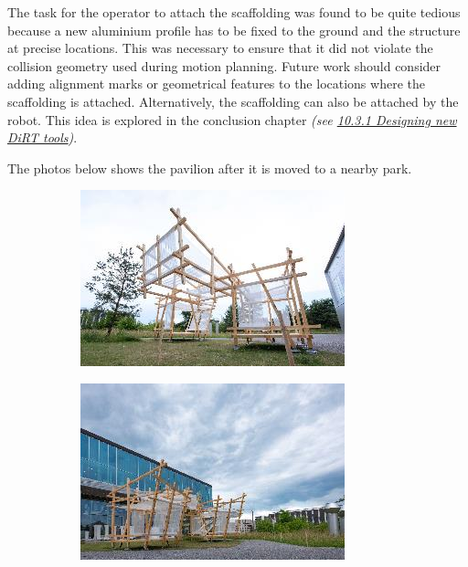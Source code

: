 \documentclass[11pt]{book}
\begin{document}
The task for the operator to attach the scaffolding was found to be quite tedious because a new aluminium profile has to be fixed to the ground and the structure at precise locations. This was necessary to ensure that it did not violate the collision geometry used during motion planning. Future work should consider adding alignment  marks or geometrical features to the locations where the scaffolding is attached. Alternatively, the scaffolding can also be attached by the robot. This idea is explored in the conclusion chapter \textit{(see \uline{10.3.1 Designing new DiRT tools})}.

The photos below shows the pavilion after it is moved to a nearby park.

\begin{figure}[H]
\centering
\begin{subfigure}[b]{0.45\textwidth}
\centering
\includegraphics[width=\textwidth]{./images/image32.jpeg}
\end{subfigure}
\hfill
\begin{subfigure}[b]{0.45\textwidth}
\centering
\includegraphics[width=\textwidth]{./images/image33.jpeg}
\end{subfigure}
\end{figure}
\end{document}
